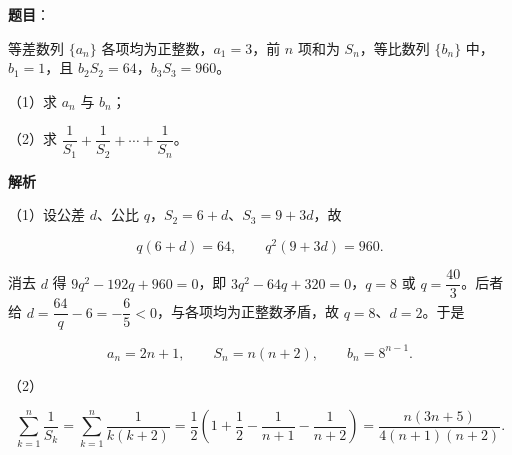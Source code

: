 \begin{answer}

\textbf{题目}：

等差数列 $\{a_n\}$ 各项均为正整数，$a_1=3$，前 $n$ 项和为 $S_n$，等比数列 $\{b_n\}$ 中，$b_1=1$，且 $b_2S_2=64$，$b_3S_3=960$。

（1）求 $a_n$ 与 $b_n$；

（2）求 $\dfrac1{S_1}+\dfrac1{S_2}+\cdots+\dfrac1{S_n}$。

\textbf{解析}

（1）设公差 $d$、公比 $q$，$S_2=6+d$、$S_3=9+3d$，故

\nopagebreak[4]
\[q(6+d)=64,\qquad q^2(9+3d)=960.\]

消去 $d$ 得 $9q^2-192q+960=0$，即 $3q^2-64q+320=0$，$q=8$ 或 $q=\dfrac{40}3$。后者给 $d=\dfrac{64}q-6=-\dfrac65<0$，与各项均为正整数矛盾，故 $q=8$、$d=2$。于是

\nopagebreak[4]
\[a_n=2n+1,\qquad S_n=n(n+2),\qquad b_n=8^{n-1}.\]

（2）

\nopagebreak[4]
\[\sum_{k=1}^n\frac1{S_k}=\sum_{k=1}^n\frac1{k(k+2)}=\frac12\left(1+\frac12-\frac1{n+1}-\frac1{n+2}\right)=\frac{n(3n+5)}{4(n+1)(n+2)}.\]


\end{answer}
